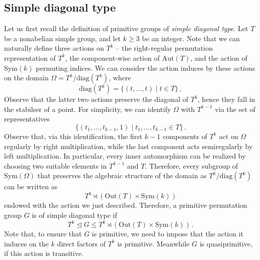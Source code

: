 \documentclass[a4paper]{amsart}
\newcommand{\Sym}{\mathrm{Sym}}
\newcommand{\Aut}{\mathrm{Aut}}
\newcommand{\Out}{\mathrm{Out}}
\theoremstyle{definition}
\begin{document}
\subsection{Simple diagonal type} \label{sec:SD}
Let us first recall the definition of primitive groups of \emph{simple diagonal type}. Let $T$ be a nonabelian simple group, and let $k \geq 3$ be an integer. Note that we can naturally define three actions on $T^k$ -- the right-regular permutation representation of $T^k$, the component-wise action of $\Aut(T)$, and the action of $\Sym(k)$ permuting indices. We can consider the action induces by these actions on the domain $\Omega = T^k / \mathrm{diag}(T^k)$, where
\[\mathrm{diag}(T^k) = \{(t, \ldots, t) \mid t \in T\} \,,\]
Observe that the latter two actions preserve the diagonal of $T^k$, hence they fall in the stabilser of a point. For simplicity, we can identify $\Omega$ with $T^{k-1}$ via the set of representatives
\[\{(t_1, \ldots, t_{k-1}, 1) \mid t_1, \ldots, t_{k-1} \in T\}   \,.\]
Observe that, via this identification, the first $k-1$ components of $T^k$ act on $ \Omega$ regularly by right multiplication, while the last component acts semiregularly by left multiplication. In particular, every inner automorphism can be realized by choosing two suitable elements in $T^{k-1}$ and $T$. Therefore, every subgroup of $\Sym(\Omega)$ that preserves the algebraic structure of the domain as $T^k / \mathrm{diag}(T^k)$ can be written as
\[ T^k \rtimes \left( \Out(T) \times \Sym(k) \right) \]
endowed with the action we just described.
Therefore, a primitive permutation group $G$ is of simple diagonal type if
\[T^k \trianglelefteq G \leq T^k \rtimes \left( \Out(T) \times \Sym(k) \right) \,.\]
Note that, to ensure that $G$ is primitive, we need to impose that the action it induces on the $k$ direct factors of $T^k$ is primitive. Meanwhile $G$ is quasiprimitive, if this action is transitive. 
\end{document}
